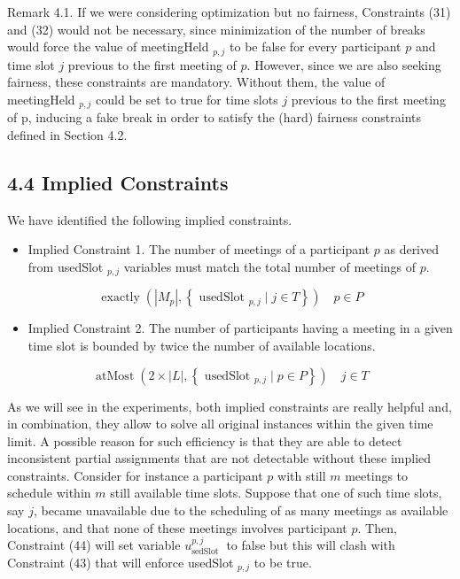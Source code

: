 \documentclass[10pt]{article}
\begin{document}
Remark 4.1. If we were considering optimization but no fairness, Constraints (31) and (32) would not be necessary, since minimization of the number of breaks would force the value of meetingHeld ${ }_{p, j}$ to be false for every participant $p$ and time slot $j$ previous to the first meeting of $p$. However, since we are also seeking fairness, these constraints are mandatory. Without them, the value of meetingHeld ${ }_{p, j}$ could be set to true for time slots $j$ previous to the first meeting of p, inducing a fake break in order to satisfy the (hard) fairness constraints defined in Section 4.2.

\subsection*{4.4 Implied Constraints}
We have identified the following implied constraints.

\begin{itemize}
  \item Implied Constraint 1. The number of meetings of a participant $p$ as derived from usedSlot $_{p, j}$ variables must match the total number of meetings of $p$.
\end{itemize}


\begin{equation*}
\operatorname{exactly}\left(\left|M_{p}\right|,\left\{\text { usedSlot }_{p, j} \mid j \in T\right\}\right) \quad p \in P \tag{43}
\end{equation*}


\begin{itemize}
  \item Implied Constraint 2. The number of participants having a meeting in a given time slot is bounded by twice the number of available locations.
\end{itemize}


\begin{equation*}
\operatorname{atMost}\left(2 \times|L|,\left\{\text { usedSlot }_{p, j} \mid p \in P\right\}\right) \quad j \in T \tag{44}
\end{equation*}


As we will see in the experiments, both implied constraints are really helpful and, in combination, they allow to solve all original instances within the given time limit. A possible reason for such efficiency is that they are able to detect inconsistent partial assignments that are not detectable without these implied constraints. Consider for instance a participant $p$ with still $m$ meetings to schedule within $m$ still available time slots. Suppose that one of such time slots, say $j$, became unavailable due to the scheduling of as many meetings as available locations, and that none of these meetings involves participant $p$. Then, Constraint (44) will set variable $u_{\text {sedSlot }}^{p, j}$ to false but this will clash with Constraint (43) that will enforce usedSlot $_{p, j}$ to be true.
\end{document}
